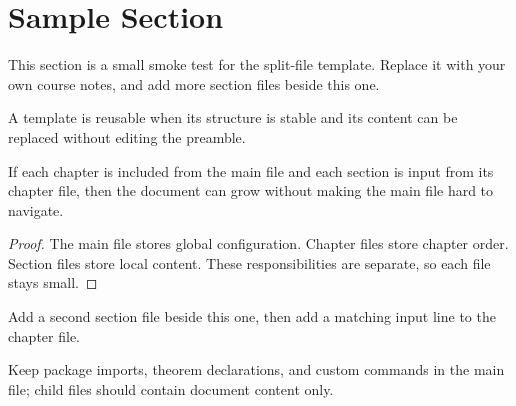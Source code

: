 \section{Sample Section}

This section is a small smoke test for the split-file template. Replace it with
your own course notes, and add more section files beside this one.

\begin{definition}
    A template is reusable when its structure is stable and its content can be
    replaced without editing the preamble.
\end{definition}

\begin{theorem}
    If each chapter is included from the main file and each section is input
    from its chapter file, then the document can grow without making the main
    file hard to navigate.
\end{theorem}

\begin{proof}
    The main file stores global configuration. Chapter files store chapter
    order. Section files store local content. These responsibilities are
    separate, so each file stays small.
\end{proof}

\begin{example}
    Add a second section file beside this one, then add a matching input line
    to the chapter file.
\end{example}

\begin{remark}
    Keep package imports, theorem declarations, and custom commands in
    the main file; child files should contain document content only.
\end{remark}
